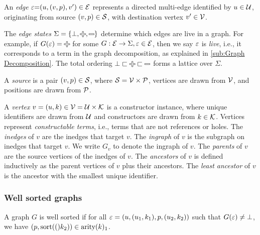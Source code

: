 An \emph{edge} $\e{=}(u, (v, p), v^\prime) \in \E$ represents a directed multi-edge
identified by $u \in \U$, originating from source $(v, p) \in \S$, with destination vertex $v' \in \V$.

The \emph{edge states} $\Sigma = \SetOf{\bot, \Plus, \Minus}$ determine which edges are live in a graph.
For example, if $G(\e) = \Plus$ for some $G : \E \rightarrow \Sigma, \e \in \E$,
then we say $\e$ is \emph{live}, i.e., it corresponds to a term in the graph decomposition, as explained in \autoref{sub:Graph Decomposition}.
The total ordering $\bot \sqsubset \Plus \sqsubset \Minus$ forms a lattice over $\Sigma$.

A \emph{source} is a pair $(v, p) \in \S$,
  where $\S = \V \times \P$,
  vertices are drawn from $\V$,
  and positions are drawn from $\P$.

A \emph{vertex} $v = (u, k) \in \V = \U \times \K$ is a constructor instance,
  where unique identifiers are drawn from $\U$
  and constructors are drawn from $k \in \K$.
Vertices represent \emph{constructable terms}, i.e., terms that are not references or holes.
The \emph{inedges} of $v$ are the inedges that target $v$.
The \emph{ingraph} of $v$ is the subgraph on inedges that target $v$.
We write $G_v$ to denote the ingraph of $v$.
The \emph{parents} of $v$ are the source vertices of the inedges of $v$.
The \emph{ancestors} of $v$ is defined inductively as the parent vertices of $v$ plus their ancestors.
The \emph{least ancestor} of $v$ is the ancestor with the smallest unique identifier.


\subsubsection{Well sorted graphs}
\label{sub:Well sorted graphs}

% 

A graph $G$ is well sorted if
for all $\e = (u, (u_1, k_1), p, (u_2, k_2))$
such that $G(\e) \neq \bot$,
we have $(p, \sort (k_2)) \in \arity k_1$.

